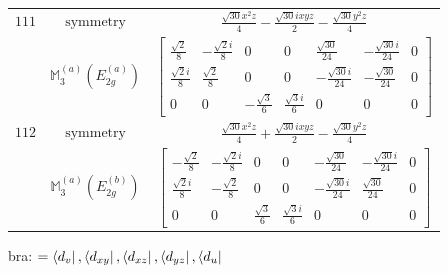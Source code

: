 \documentclass[fleqn,8pt,landscape]{jsarticle}
\begin{document}
\begin{longtable}{ccc}
$ 111 $ & $ \text{symmetry} $ & $ \frac{\sqrt{30} x^{2} z}{4} - \frac{\sqrt{30} i x y z}{2} - \frac{\sqrt{30} y^{2} z}{4} $ \\
$  $ & $ \mathbb{M}_{3}^{(a)}(E_{2g}^{(a)}) $ & $ \begin{bmatrix} \frac{\sqrt{2}}{8} & - \frac{\sqrt{2} i}{8} & 0 & 0 & \frac{\sqrt{30}}{24} & - \frac{\sqrt{30} i}{24} & 0 \\ \frac{\sqrt{2} i}{8} & \frac{\sqrt{2}}{8} & 0 & 0 & - \frac{\sqrt{30} i}{24} & - \frac{\sqrt{30}}{24} & 0 \\ 0 & 0 & - \frac{\sqrt{3}}{6} & \frac{\sqrt{3} i}{6} & 0 & 0 & 0 \end{bmatrix} $ \\ \hline
$ 112 $ & $ \text{symmetry} $ & $ \frac{\sqrt{30} x^{2} z}{4} + \frac{\sqrt{30} i x y z}{2} - \frac{\sqrt{30} y^{2} z}{4} $ \\
$  $ & $ \mathbb{M}_{3}^{(a)}(E_{2g}^{(b)}) $ & $ \begin{bmatrix} - \frac{\sqrt{2}}{8} & - \frac{\sqrt{2} i}{8} & 0 & 0 & - \frac{\sqrt{30}}{24} & - \frac{\sqrt{30} i}{24} & 0 \\ \frac{\sqrt{2} i}{8} & - \frac{\sqrt{2}}{8} & 0 & 0 & - \frac{\sqrt{30} i}{24} & \frac{\sqrt{30}}{24} & 0 \\ 0 & 0 & \frac{\sqrt{3}}{6} & \frac{\sqrt{3} i}{6} & 0 & 0 & 0 \end{bmatrix} $ \\ \hline
\end{longtable}
bra: $=\bra{d_{v}}, \bra{d_{xy}}, \bra{d_{xz}}, \bra{d_{yz}}, \bra{d_{u}}$
\end{document}
